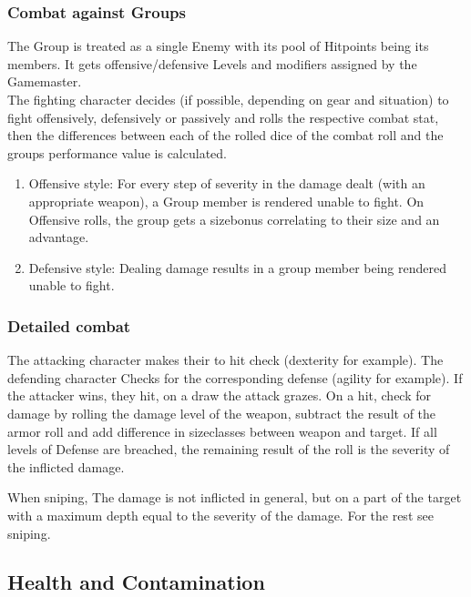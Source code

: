     \subsubsection{Combat against Groups}
    The Group is treated as a single Enemy with its pool of Hitpoints being its members.
    It gets offensive/defensive Levels and modifiers assigned by the Gamemaster.\\
    The fighting character decides (if possible, depending on gear and situation) to fight offensively, defensively
    or passively and rolls the respective combat stat, then the differences between each of the rolled dice of the combat
    roll and the groups performance value is calculated.\par
    \begin{enumerate}[label= - ]
        \item Offensive style: For every step of severity in the damage dealt (with an appropriate weapon),
        a Group member is rendered unable to
        fight.
        On Offensive rolls, the group gets a sizebonus correlating to their size and an advantage.
        \item Defensive style: Dealing damage results in a group member being rendered unable to fight.
    \end{enumerate}
    \subsubsection{Detailed combat}
    The attacking character makes their to hit check (dexterity for example).
    The defending character Checks for the
    corresponding defense (agility for example).
    If the attacker wins, they hit, on a draw the
    attack grazes.
    On a hit, check for damage by rolling the damage level of the weapon, subtract the result of the
    armor roll and add difference in sizeclasses between weapon and target.
    If all levels of Defense are breached, the remaining result of the roll is the severity of the inflicted damage.\par
    When sniping, The damage is not inflicted in general, but on a part of the target with a maximum depth equal to
    the severity of the damage.
    For the rest see sniping.
    \subsection{Health and Contamination}\label{subsec:healthAndContamination}
